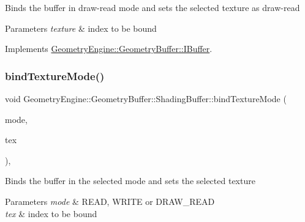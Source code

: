 Binds the buffer in draw-\/read mode and sets the selected texture as draw-\/read 
\begin{DoxyParams}{Parameters}
{\em texture} & index to be bound \\
\hline
\end{DoxyParams}


Implements \mbox{\hyperlink{class_geometry_engine_1_1_geometry_buffer_1_1_i_buffer_a21843472d95d9c495a5df733ef2a64e3}{Geometry\+Engine\+::\+Geometry\+Buffer\+::\+I\+Buffer}}.

\mbox{\label{class_geometry_engine_1_1_geometry_buffer_1_1_shading_buffer_af589a4ab3f3c3cd92c373dc026e731ae}} 
\subsubsection{\texorpdfstring{bindTextureMode()}{bindTextureMode()}}
{\footnotesize\ttfamily void Geometry\+Engine\+::\+Geometry\+Buffer\+::\+Shading\+Buffer\+::bind\+Texture\+Mode (\begin{DoxyParamCaption}\item[{Geometry\+Buffer\+::\+G\+\_\+\+F\+R\+A\+M\+E\+B\+U\+F\+F\+E\+R\+\_\+\+B\+I\+N\+DS}]{mode,  }\item[{unsigned int}]{tex }\end{DoxyParamCaption})\hspace{0.3cm}{\ttfamily [protected]}, {\ttfamily [virtual]}}

Binds the buffer in the selected mode and sets the selected texture 
\begin{DoxyParams}{Parameters}
{\em mode} & R\+E\+AD, W\+R\+I\+TE or D\+R\+A\+W\+\_\+\+R\+E\+AD \\
\hline
{\em tex} & index to be bound \\
\hline
\end{DoxyParams}
\mbox{\label{class_geometry_engine_1_1_geometry_buffer_1_1_shading_buffer_afe933c5c15ed7e488f5094ef2ddf8c4b}} 
